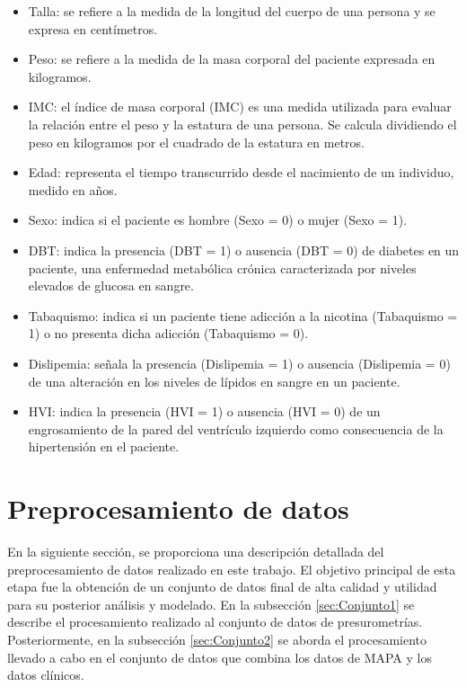 \begin{itemize}
  \item Talla: se refiere a la medida de la longitud del cuerpo de una persona y se expresa en centímetros.
  \item Peso: se refiere a la medida de la masa corporal del paciente expresada en kilogramos.
  \item IMC: el índice de masa corporal (IMC) es una medida utilizada para evaluar la relación entre el peso y la estatura de una persona. Se calcula dividiendo el peso en kilogramos por el cuadrado de la estatura en metros.
  \item Edad: representa el tiempo transcurrido desde el nacimiento de un individuo, medido en años.
  \item Sexo: indica si el paciente es hombre (Sexo = 0) o mujer (Sexo = 1).
  \item DBT: indica la presencia (DBT = 1) o ausencia (DBT = 0) de diabetes en un paciente, una enfermedad metabólica crónica caracterizada por niveles elevados de glucosa en sangre.
  \item Tabaquismo: indica si un paciente tiene adicción a la nicotina (Tabaquismo = 1) o no presenta dicha adicción (Tabaquismo = 0).
  \item Dislipemia: señala la presencia (Dislipemia = 1) o ausencia (Dislipemia = 0) de una alteración en los niveles de lípidos en sangre en un paciente.
  \item HVI: indica la presencia (HVI = 1) o ausencia (HVI = 0) de un engrosamiento de la pared del ventrículo izquierdo como consecuencia de la hipertensión en el paciente.
\end{itemize}

\section{Preprocesamiento de datos}
En la siguiente sección, se proporciona una descripción detallada del preprocesamiento de datos 
realizado en este trabajo. El objetivo principal de esta etapa fue la obtención de un conjunto de 
datos final de alta calidad y utilidad para su posterior análisis y modelado. En la subsección 
\ref{sec:Conjunto1} se describe el procesamiento realizado al conjunto de datos de presurometrías. 
Posteriormente, en la subsección \ref{sec:Conjunto2} se aborda el procesamiento 
llevado a cabo en el conjunto de datos que combina los datos de MAPA y los datos clínicos.

